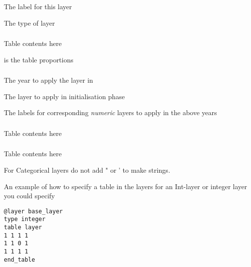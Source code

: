  {The label for this layer}

 {The type of layer}

\subsubsection[Numeric]{}
 {}
Table contents here\\
 {}

 {is the table proportions}

\subsubsection[Numeric Meta layer]{}
 {The year to apply the layer in}

 {The layer to apply in initialisation phase}

 {The labels for corresponding \emph{numeric} layers to apply in the above years}

\subsubsection[Integer]{}
 {}
Table contents here\\
 {}


\subsubsection[Categorical]{}
 {}
Table contents here\\
 {}

For Categorical layers do not add " or ' to make strings.


An example of how to specify a table in the layers for an Int-layer or integer layer you could specify

{\small{\begin{verbatim}
@layer base_layer
type integer		
table layer
1 1 1 1
1 1 0 1
1 1 1 1
end_table
\end{verbatim}}}

